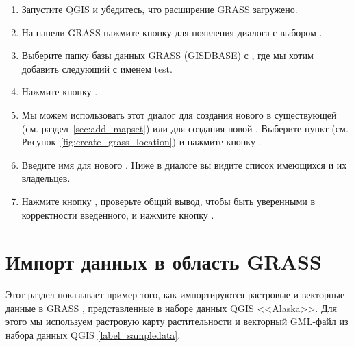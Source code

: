 \begin{enumerate}
  \item Запустите QGIS и убедитесь, что расширение GRASS загружено.
  \item На панели GRASS нажмите кнопку 
  для появления диалога с выбором .
  \item Выберите папку базы данных GRASS (GISDBASE) 
  с , где мы хотим добавить следующий
   с именем test.
  \item Нажмите кнопку .
  \item Мы можем использовать этот диалог для создания нового
   в существующей 
  (см. раздел~\ref{sec:add_mapset}) или для создания новой
  . Выберите пункт 
  (см. Рисунок~\ref{fig:create_grass_location}) и нажмите кнопку .
  \item Введите имя  для нового . Ниже
  в диалоге вы видите список имеющихся  и их владельцев.
  \item Нажмите кнопку , проверьте общий вывод, чтобы быть
  уверенными в корректности введенного, и нажмите кнопку .
\end{enumerate}

\section{Импорт данных в область GRASS}\label{sec:import_loc_data}

Этот раздел показывает пример того, как импортируются растровые и
векторные данные в  GRASS ,
представленные в наборе данных QGIS <<Alaska>>. Для этого мы используем
растровую карту растительности  и векторный
GML-файл  из набора данных QGIS \ref{label_sampledata}.

